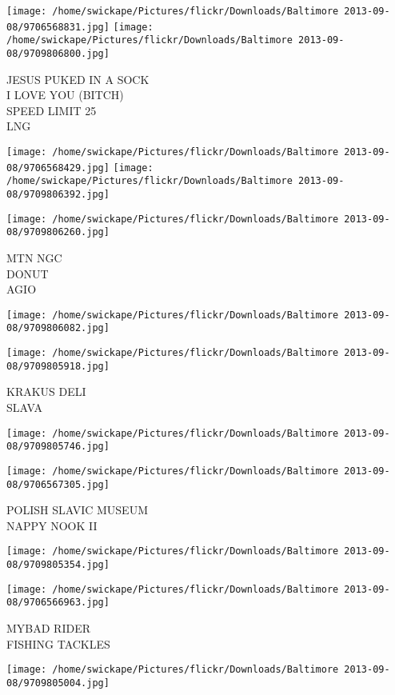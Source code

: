 \documentclass[10pt,letterpaper]{article}
\begin{document}
\texttt{[image: /home/swickape/Pictures/flickr/Downloads/Baltimore 2013-09-08/9706568831.jpg]}
\texttt{[image: /home/swickape/Pictures/flickr/Downloads/Baltimore 2013-09-08/9709806800.jpg]}

JESUS PUKED IN A SOCK\\
I LOVE YOU (BITCH)\\
SPEED LIMIT 25\\
LNG
\pagebreak

\texttt{[image: /home/swickape/Pictures/flickr/Downloads/Baltimore 2013-09-08/9706568429.jpg]}
\texttt{[image: /home/swickape/Pictures/flickr/Downloads/Baltimore 2013-09-08/9709806392.jpg]}

\texttt{[image: /home/swickape/Pictures/flickr/Downloads/Baltimore 2013-09-08/9709806260.jpg]}

MTN NGC\\
DONUT\\
AGIO
\pagebreak

\texttt{[image: /home/swickape/Pictures/flickr/Downloads/Baltimore 2013-09-08/9709806082.jpg]}

\vspace{0.25in}
\texttt{[image: /home/swickape/Pictures/flickr/Downloads/Baltimore 2013-09-08/9709805918.jpg]}

KRAKUS DELI\\
SLAVA
\pagebreak

\texttt{[image: /home/swickape/Pictures/flickr/Downloads/Baltimore 2013-09-08/9709805746.jpg]}

\vspace{0.25in}
\texttt{[image: /home/swickape/Pictures/flickr/Downloads/Baltimore 2013-09-08/9706567305.jpg]}

POLISH SLAVIC MUSEUM\\
NAPPY NOOK II
\pagebreak

\texttt{[image: /home/swickape/Pictures/flickr/Downloads/Baltimore 2013-09-08/9709805354.jpg]}

\vspace{0.25in}
\texttt{[image: /home/swickape/Pictures/flickr/Downloads/Baltimore 2013-09-08/9706566963.jpg]}

MYBAD RIDER\\
FISHING TACKLES
\pagebreak

\texttt{[image: /home/swickape/Pictures/flickr/Downloads/Baltimore 2013-09-08/9709805004.jpg]}
\end{document}
